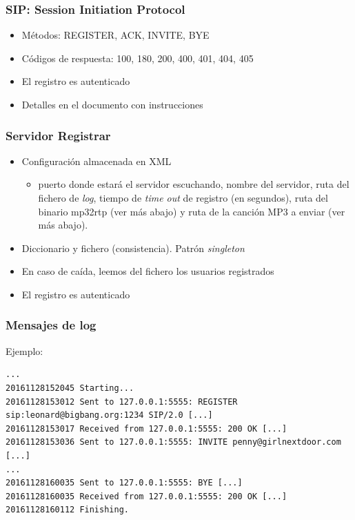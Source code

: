 \documentclass{beamer}
\begin{document}

\begin{frame}
\frametitle{SIP: Session Initiation Protocol}

\begin{itemize}
  \item Métodos: REGISTER, ACK, INVITE, BYE
  \item Códigos de respuesta: 100, 180, 200, 400, 401, 404, 405
  \item El registro es autenticado
  \item Detalles en el documento con instrucciones
\end{itemize}


\end{frame}





\begin{frame}
\frametitle{Servidor Registrar}

\begin{itemize}
  \item Configuración almacenada en XML
  \begin{itemize}
    \item puerto donde estará el servidor escuchando, nombre del servidor, ruta del fichero de \emph{log}, tiempo de \emph{time out} de registro (en segundos), ruta del binario mp32rtp (ver más abajo) y ruta de la canción MP3 a enviar (ver más abajo).
   \end{itemize}
   \item Diccionario y fichero (consistencia). Patrón \emph{singleton}
   \item En caso de caída, leemos del fichero los usuarios registrados
   \item El registro es autenticado
\end{itemize}

\end{frame}


\begin{frame}[fragile]
\frametitle{Mensajes de log}

Ejemplo:

\begin{footnotesize}
\begin{verbatim}
...
20161128152045 Starting...
20161128153012 Sent to 127.0.0.1:5555: REGISTER sip:leonard@bigbang.org:1234 SIP/2.0 [...]
20161128153017 Received from 127.0.0.1:5555: 200 OK [...]
20161128153036 Sent to 127.0.0.1:5555: INVITE penny@girlnextdoor.com [...]
...
20161128160035 Sent to 127.0.0.1:5555: BYE [...]
20161128160035 Received from 127.0.0.1:5555: 200 OK [...]
20161128160112 Finishing.
\end{verbatim}
\end{footnotesize}
\end{frame} 
\end{document}
